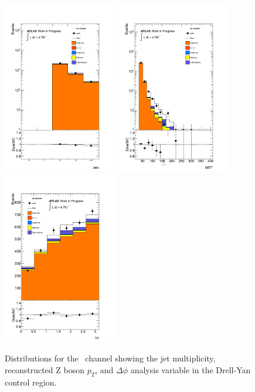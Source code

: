 \begin{figure}[hbtp!]
	 \begin{center}
         \includegraphics[width=50mm]{f/ee_dy_njet_central_double}
         \includegraphics[width=50mm]{f/ee_dy_met_central_double}
         \includegraphics[width=50mm]{f/ee_dy_delta_phi_central_double}
       \end{center}
       \caption{Distributions for the \ee\ channel showing the jet multiplicity, reconstructed Z boson $p_{T}$, and $\Delta\phi$ analysis variable in the Drell-Yan control region.}
     \label{fig:ee_control_dy}
\end{figure}


